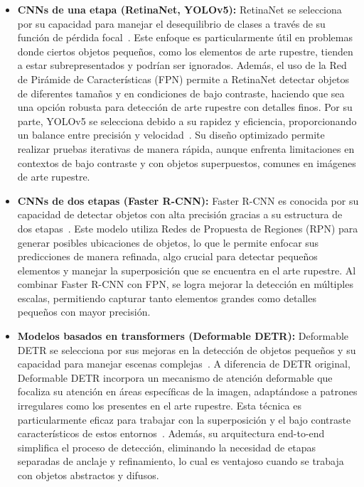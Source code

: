 \begin{itemize}
    \item \textbf{CNNs de una etapa (RetinaNet, YOLOv5):}
    RetinaNet se selecciona por su capacidad para manejar el desequilibrio de clases a través de su función de pérdida focal~\cite{lin2017focal}.
    Este enfoque es particularmente útil en problemas donde ciertos objetos pequeños, como los elementos de arte rupestre, tienden a estar subrepresentados y podrían ser ignorados.
    Además, el uso de la Red de Pirámide de Características (FPN) permite a RetinaNet detectar objetos de diferentes tamaños y en condiciones de bajo contraste, haciendo que sea una opción robusta para detección de arte rupestre con detalles finos.
    Por su parte, YOLOv5 se selecciona debido a su rapidez y eficiencia, proporcionando un balance entre precisión y velocidad~\cite{yolov5}.
    Su diseño optimizado permite realizar pruebas iterativas de manera rápida, aunque enfrenta limitaciones en contextos de bajo contraste y con objetos superpuestos, comunes en imágenes de arte rupestre.

    \item \textbf{CNNs de dos etapas (Faster R-CNN):}
    Faster R-CNN es conocida por su capacidad de detectar objetos con alta precisión gracias a su estructura de dos etapas~\cite{ren2015faster}.
    Este modelo utiliza Redes de Propuesta de Regiones (RPN) para generar posibles ubicaciones de objetos, lo que le permite enfocar sus predicciones de manera refinada, algo crucial para detectar pequeños elementos y manejar la superposición que se encuentra en el arte rupestre.
    Al combinar Faster R-CNN con FPN, se logra mejorar la detección en múltiples escalas, permitiendo capturar tanto elementos grandes como detalles pequeños con mayor precisión.

    \item \textbf{Modelos basados en transformers (Deformable DETR):}
    Deformable DETR se selecciona por sus mejoras en la detección de objetos pequeños y su capacidad para manejar escenas complejas~\cite{zhu2021}.
    A diferencia de DETR original, Deformable DETR incorpora un mecanismo de atención deformable que focaliza su atención en áreas específicas de la imagen, adaptándose a patrones irregulares como los presentes en el arte rupestre.
    Esta técnica es particularmente eficaz para trabajar con la superposición y el bajo contraste característicos de estos entornos~\cite{horn2022,suhaimi2023}.
    Además, su arquitectura end-to-end simplifica el proceso de detección, eliminando la necesidad de etapas separadas de anclaje y refinamiento, lo cual es ventajoso cuando se trabaja con objetos abstractos y difusos.
\end{itemize}

